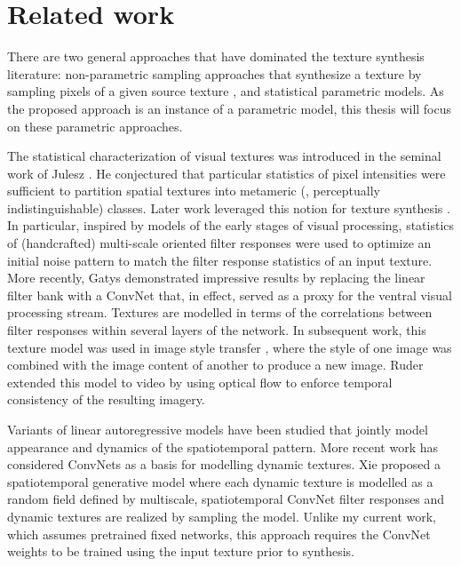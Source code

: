 \chapter{Related work } \label{chap:related_work}

There are two general approaches that have dominated the texture
synthesis literature: non-parametric sampling approaches that
synthesize a texture by sampling pixels of a given source texture
\cite{efros1999,kwatra2003graphcut,schodl2000,wei2000}, and 
statistical parametric models.
As the proposed approach is an instance of a parametric model, this thesis 
will focus on these parametric approaches.

The statistical characterization of visual textures was introduced
in the seminal work of Julesz \cite{julesz1962}.
He conjectured that particular statistics of pixel intensities
were sufficient to partition spatial textures into metameric (\ie,
perceptually indistinguishable) classes.
Later work leveraged this notion for texture synthesis
\cite{heeger1995pyramid,portilla2000parametric}.
In particular, inspired by models of the early stages of visual 
processing, statistics of (handcrafted) multi-scale oriented filter 
responses were used to optimize an initial noise pattern 
to match the filter response statistics of an input texture.
More recently, Gatys \etal \cite{gatys2015} demonstrated
impressive results by replacing the linear filter bank with a
ConvNet that, in effect, served as a proxy for the ventral visual
processing stream.
Textures are modelled in terms of the correlations between filter 
responses within several layers of the network.
In subsequent work, this texture model was used in image style
transfer \cite{gatys2016image}, where the style of one image was
combined with the image content of another to produce a new image.
Ruder \etal \cite{ruder2016} extended this model to video by using
optical flow to enforce temporal consistency of the
resulting imagery.

Variants of linear autoregressive models have been studied
\cite{szummer1996,doretto2003} that jointly model appearance and
dynamics of the spatiotemporal pattern.
More recent work has considered ConvNets as a basis for modelling 
dynamic textures.
Xie \etal \cite{xie2017synthesizing} proposed a spatiotemporal
generative model where each dynamic texture is modelled as a random
field defined by multiscale, spatiotemporal ConvNet filter responses
and dynamic textures are realized by sampling the model.
Unlike my current work, which assumes pretrained fixed networks,
this approach requires the ConvNet weights to be trained using the
input texture prior to synthesis.

